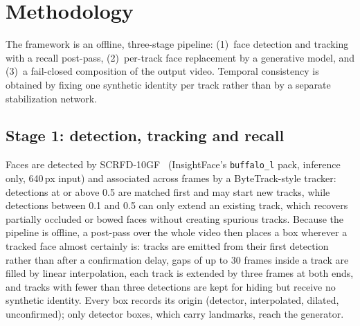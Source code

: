 
\section{Methodology}

The framework is an offline, three-stage pipeline: (1)~face detection and
tracking with a recall post-pass, (2)~per-track face replacement by a
generative model, and (3)~a fail-closed composition of the output video.
Temporal consistency is obtained by fixing one synthetic identity per track
rather than by a separate stabilization network.

\subsection{Stage 1: detection, tracking and recall}

Faces are detected by SCRFD-10GF~\cite{scrfd} (InsightFace's \texttt{buffalo\_l}
pack, inference only, 640\,px input) and associated across frames by a
ByteTrack-style tracker: detections at or above 0.5 are matched first and may
start new tracks, while detections between 0.1 and 0.5 can only extend an
existing track, which recovers partially occluded or bowed faces without
creating spurious tracks. Because the pipeline is offline, a post-pass over the
whole video then places a box wherever a tracked face almost certainly is:
tracks are emitted from their first detection rather than after a
confirmation delay, gaps of up to 30 frames inside a track are filled by
linear interpolation, each track is extended by three frames at both ends, and
tracks with fewer than three detections are kept for hiding but receive no
synthetic identity. Every box records its origin (detector, interpolated,
dilated, unconfirmed); only detector boxes, which carry landmarks, reach the
generator.

